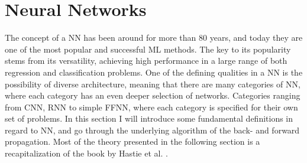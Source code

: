 \section{Neural Networks}\label{sec:NN}
The concept of a \ac{NN} has been around for more than 80 years, and today they are one 
of the most popular and successful \ac{ML} methods. The key to its popularity stems from
its versatility, achieving high performance in a large range of both regression 
and classification problems. One of the defining qualities in a \ac{NN} is the 
possibility of diverse architecture, meaning that there are many
categories of \ac{NN}, where each category has an even deeper selection of
networks. Categories ranging from \ac{CNN}, \ac{RNN} to simple \ac{FFNN}, where each
category is specified for their own set of problems. In this section I will introduce 
some fundamental definitions in regard to \ac{NN}, and go through the underlying 
algorithm of the back- and forward propagation. Most of the theory presented in the 
following section is a recapitalization of the book by Hastie et al. \cite{hastie_neural_2009}.

